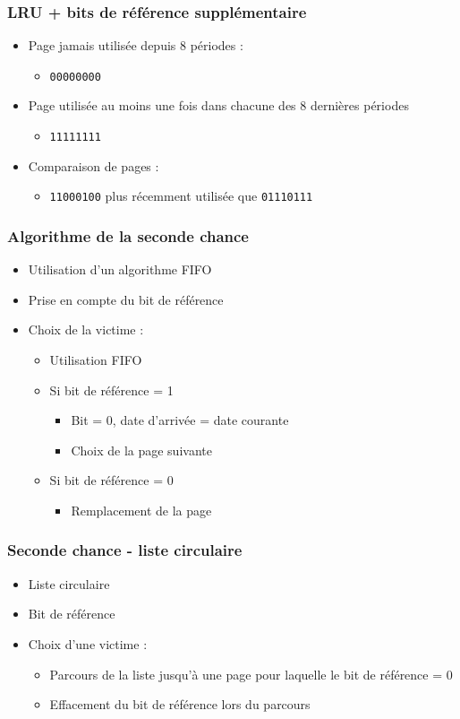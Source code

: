 \begin{frame}
\frametitle{LRU + bits de référence supplémentaire}
\begin{itemize}
\item Page jamais utilisée depuis 8 périodes :
\begin{itemize}
\item \texttt{00000000}
\end{itemize}
\item Page utilisée au moins une fois dans chacune des 8 dernières périodes
\begin{itemize}
\item \texttt{11111111}
\end{itemize}
\item Comparaison de pages :
\begin{itemize}
\item \texttt{11000100} plus récemment utilisée que \texttt{01110111}
\end{itemize}
\end{itemize}
\end{frame}


\begin{frame}
\frametitle{Algorithme de la seconde chance}
\begin{itemize}
\item Utilisation d'un algorithme FIFO
\item Prise en compte du bit de référence
\item Choix de la victime :
\begin{itemize}
\item Utilisation FIFO
\item Si bit de référence = 1
\begin{itemize}
\item Bit = 0, date d'arrivée = date courante
\item Choix de la page suivante
\end{itemize}
\item Si bit de référence = 0
\begin{itemize}
\item Remplacement de la page
\end{itemize}
\end{itemize}
\end{itemize}
\end{frame}


\begin{frame}
\frametitle{Seconde chance - liste circulaire}
\begin{itemize}
\item Liste circulaire
\item Bit de référence
\item Choix d'une victime :
\begin{itemize}
\item Parcours de la liste jusqu'à une page pour laquelle le bit de référence = 0
\item Effacement du bit de référence lors du parcours
\end{itemize}
\end{itemize}
\end{frame}


